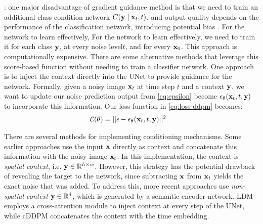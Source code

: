 : one major disadvantage of gradient guidance method is that we need to train an additional class condition network $C({\mathbf{y}} \mid {\mathbf{x}}_t, t)$, and output quality depends on the performance of the classification network, introducing potential bias \cite{berceaDDPMforMedicalImagesStudy2024}. For the network to learn effectively, For the network to learn effectively, we need to train it for each class ${\mathbf{y}}$, at every noise level$t$, and for every ${\mathbf{x}}_0$. This approach is computationally expensive. There are some alternative methods that leverage this score-based function without needing to train a classifier network. One approach is to inject the context directly into the UNet to provide guidance for the network. Formally, given a noisy image ${\mathbf{x}}_t$ at time step $t$ and a context ${\mathbf{y}}$, we want to update our noise prediction output from \cref{eq:epsilon} become $\epsilon_{\theta}({\mathbf{x}}_t, t, {\mathbf{y}})$ to incorporate this information.
 Our loss function in \cref{eq:loss-ddpm} becomes:
\begin{align}
    \mathcal{L} (\theta) &= || \epsilon - \epsilon_{\theta}({\mathbf{x}}_t, t, {\mathbf{y}})||^2 \label{ep:loss-cond-ddpm}
\end{align}

There are several methods for implementing conditioning mechanisms. Some earlier approaches use the input ${\mathbf{x}}$ directly as context and concatenate this information with the noisy image ${\mathbf{x}}_t$. In this implementation, the context is \emph{spatial context}, i.e. ${\mathbf{y}} \in \mathbb{R}^{h \times w}$. However, this strategy has the potential drawback of revealing the target to the network, since subtracting ${\mathbf{x}}$ from ${\mathbf{x}}_t$ yields the exact noise that was added. To address this, more recent approaches use \emph{non-spatial context} ${\mathbf{y}} \in \mathbb{R}^d$, which is generated by a semantic encoder network. LDM \cite{rombachLDM} employs a cross-attention module to inject context at every step of the UNet, while cDDPM \cite{behrendt2025cDDPM} concatenates the context with the time embedding. 



